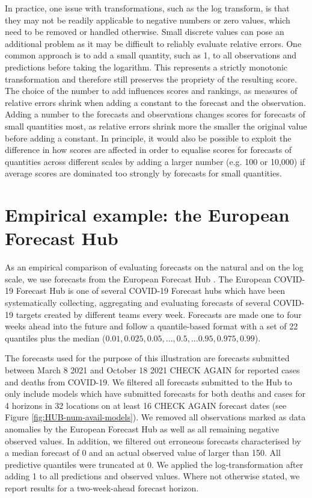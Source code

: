 \documentclass{article}
\begin{document}
In practice, one issue with transformations, such as the log transform, is that they may not be readily applicable to negative numbers or zero values, which need to be removed or handled otherwise. Small discrete values can pose an additional problem as it may be difficult to reliably evaluate relative errors. 
One common approach is to add a small quantity, such as 1, to all observations and predictions before taking the logarithm. This represents a strictly monotonic transformation and therefore still preserves the propriety of the resulting score. The choice of the number to add influences scores and rankings, as measures of relative errors shrink when adding a constant to the forecast and the observation. Adding a number to the forecasts and observations changes scores for forecasts of small quantities most, as relative errors shrink more the smaller the original value before adding a constant. In principle, it would also be possible to exploit the difference in how scores are affected in order to equalise scores for forecasts of quantities across different scales by adding a larger number (e.g. 100 or 10,000) if average scores are dominated too strongly by forecasts for small quantities. 



\section{Empirical example: the European Forecast Hub}
\label{sec:results}

As an empirical comparison of evaluating forecasts on the natural and on the log scale, we use forecasts from the European Forecast Hub \citep{europeancovid-19forecasthubEuropeanCovid19Forecast2021, sherrattPredictivePerformanceMultimodel2022}. 
The European COVID-19 Forecast Hub is one of several COVID-19 Forecast hubs\citep{cramerEvaluationIndividualEnsemble2021, bracherShorttermForecastingCOVID192021} which have been systematically collecting, aggregating and evaluating forecasts of several COVID-19 targets created by different teams every week. Forecasts are made one to four weeks ahead into the future and follow a quantile-based format with a set of 22 quantiles plus the median ($0.01, 0.025, 0.05, ..., 0.5, ... 0.95, 0.975, 0.99$). 

The forecasts used for the purpose of this illustration are forecasts submitted between March 8 2021 and October 18 2021 CHECK AGAIN for reported cases and deaths from COVID-19. We filtered all forecasts submitted to the Hub to only include models which have submitted forecasts for both deaths and cases for 4 horizons in 32 locations on at least 16 CHECK AGAIN forecast dates (see Figure \ref{fig:HUB-num-avail-models}). We removed all observations marked as data anomalies by the European Forecast Hub as well as all remaining negative observed values. In addition, we filtered out erroneous forecasts characterised by a median forecast of 0 and an actual observed value of larger than 150. All predictive quantiles were truncated at 0. We applied the log-transformation after adding 1 to all predictions and observed values. Where not otherwise stated, we report results for a two-week-ahead forecast horizon. 
\end{document}
